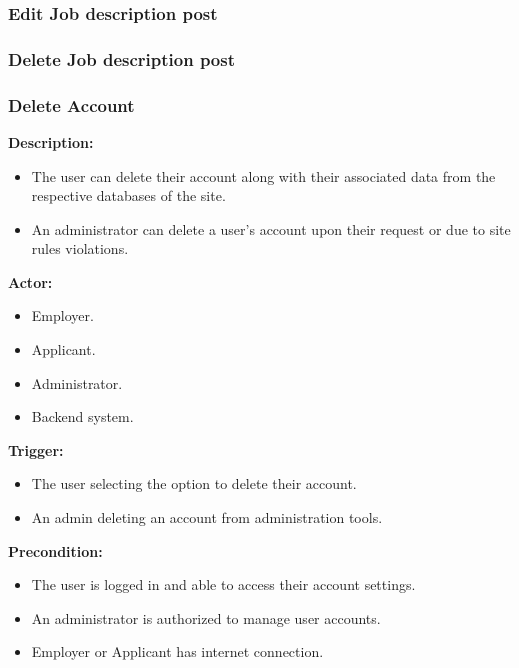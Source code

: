 \documentclass[a4paper]{article}
\begin{document}
        \subsubsection{Edit Job description post}

        \subsubsection{Delete Job description post}

        \subsubsection{Delete Account}
        \textbf{Description:}
        \begin{itemize}
            \item The user can delete their account along with their associated data from the respective databases of the site.
            \item An administrator can delete a user's account upon their request or due to site rules violations.
        \end{itemize}

        \textbf{Actor:}
        \begin{itemize}
            \item Employer.
            \item Applicant.
            \item Administrator.
            \item Backend system.
        \end{itemize}
        
        \textbf{Trigger:}
        \begin{itemize}
            \item The user selecting the option to delete their account.
            \item An admin deleting an account from administration tools.
        \end{itemize}

        \textbf{Precondition:}
        \begin{itemize}
            \item The user is logged in and able to access their account settings.
            \item An administrator is authorized to manage user accounts.
            \item Employer or Applicant has internet connection.
        \end{itemize}
\end{document}
